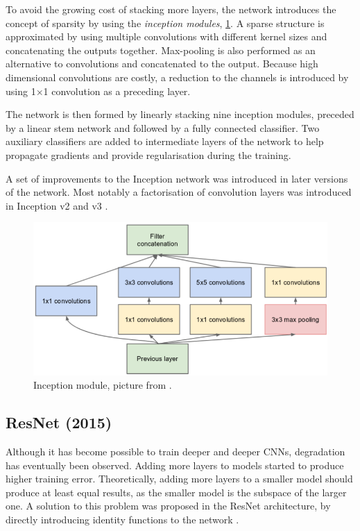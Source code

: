 To avoid the growing cost of stacking more layers, the network introduces the concept of sparsity by using the \textit{inception modules}, \cref{fig:incept_mod}. A sparse structure is approximated by using multiple convolutions with different kernel sizes and concatenating the outputs together. Max-pooling is also performed as an alternative to convolutions and concatenated to the output. Because high dimensional convolutions are costly, a reduction to the channels is introduced by using 1$\times$1 convolution as a preceding layer.

The network is then formed by linearly stacking nine inception modules, preceded by a linear stem network and followed by a fully connected classifier. Two auxiliary classifiers are added to intermediate layers of the network to help propagate gradients and provide regularisation during the training.

A set of improvements to the Inception network was introduced in later versions of the network. Most notably a factorisation of convolution layers was introduced in Inception v2 and v3 \cite{bib:inception2}.


\begin{figure}
    \includegraphics[width=\textwidth]{img/inception}
    \caption{Inception module, picture from \cite[figure 2]{bib:googlenet}.}
    \label{fig:incept_mod}
\end{figure}

\subsection{ResNet (2015)}
\label{sec:resnet}

Although it has become possible to train deeper and deeper CNNs, degradation has eventually been observed. Adding more layers to models started to produce higher training error. Theoretically, adding more layers to a smaller model should produce at least equal results, as the smaller model is the subspace of the larger one. A solution to this problem was proposed in the ResNet architecture, by directly introducing identity functions to the network \cite{bib:resnet}.  


